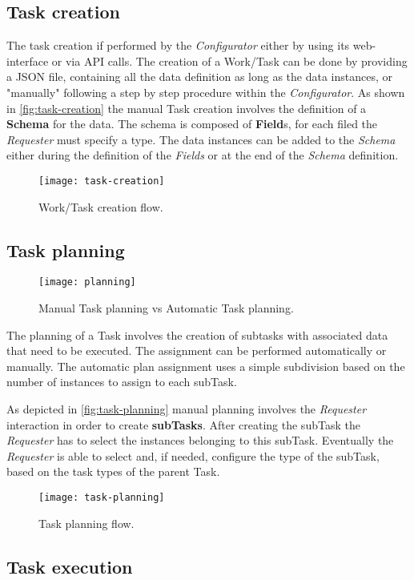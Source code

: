 \subsection{Task creation}
The task creation if performed by the \emph{Configurator} either by using its
web-interface or via API calls. The creation of a Work/Task can be done by
providing a JSON file, containing all the data definition as long as the data
instances, or "manually" following a step by step procedure within the
\emph{Configurator}. As shown in \autoref{fig:task-creation} the manual Task
creation involves the definition of a \textbf{Schema} for the data. The schema
is composed of \textbf{Field}s, for each filed the \emph{Requester} must specify
a type. The data instances can be added to the \emph{Schema} either during the
definition of the \emph{Fields} or at the end of the \emph{Schema} definition.

\begin{figure}[htb]
    \centering
    \texttt{[image: task-creation]}
    \caption{Work/Task creation flow.}
    \label{fig:task-creation}
\end{figure}



\subsection{Task planning}
\begin{figure}[htb]
    \centering
    \texttt{[image: planning]}
    \caption{Manual Task planning vs Automatic Task planning.}
    \label{fig:auto-manual-planning}
\end{figure}
The planning of a Task involves the creation of subtasks with associated data
that need to be executed. The assignment can be performed automatically or
manually. The automatic plan assignment uses a simple subdivision based on the
number of instances to assign to each subTask.

As depicted in \autoref{fig:task-planning} manual planning involves the
\emph{Requester} interaction in order to create \textbf{subTasks}. After creating
the subTask the \emph{Requester} has to select the instances belonging to this
subTask. Eventually the \emph{Requester} is able to select and, if needed,
configure the type of the subTask, based on the task types of the parent Task.
\begin{figure}[htb]
    \centering
    \texttt{[image: task-planning]}
    \caption{Task planning flow.}
    \label{fig:task-planning}
\end{figure}



\subsection{Task execution}








